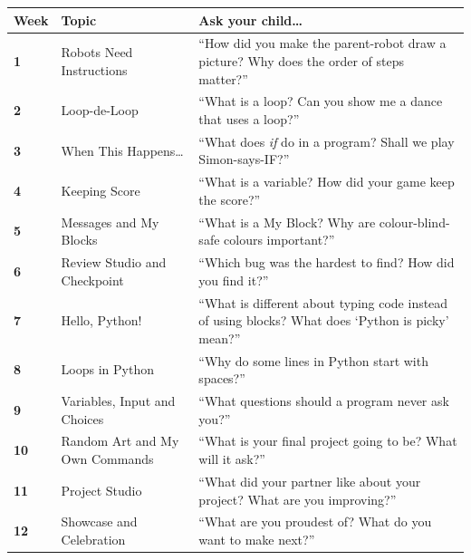 \documentclass[level=1]{kidscode}
\begin{document}
\begin{center}\small\renewcommand{\arraystretch}{1.45}
\begin{tabularx}{\linewidth}{@{}>{\bfseries}p{1.3cm}>{\RaggedRight}p{4.2cm}>{\RaggedRight\arraybackslash}X@{}}
\toprule
Week & Topic & Ask your child\dots\\
\midrule
1 & Robots Need Instructions & \enquote{How did you make the parent-robot draw a picture? Why does the order of steps matter?}\\
2 & Loop-de-Loop & \enquote{What is a loop? Can you show me a dance that uses a loop?}\\
3 & When This Happens\dots & \enquote{What does \emph{if} do in a program? Shall we play Simon-says-IF?}\\
4 & Keeping Score & \enquote{What is a variable? How did your game keep the score?}\\
5 & Messages and My Blocks & \enquote{What is a My Block? Why are colour-blind-safe colours important?}\\
6 & Review Studio and Checkpoint & \enquote{Which bug was the hardest to find? How did you find it?}\\
7 & Hello, Python! & \enquote{What is different about typing code instead of using blocks? What does \enquote{Python is picky} mean?}\\
8 & Loops in Python & \enquote{Why do some lines in Python start with spaces?}\\
9 & Variables, Input and Choices & \enquote{What questions should a program never ask you?}\\
10 & Random Art and My Own Commands & \enquote{What is your final project going to be? What will it ask?}\\
11 & Project Studio & \enquote{What did your partner like about your project? What are you improving?}\\
12 & Showcase and Celebration & \enquote{What are you proudest of? What do you want to make next?}\\
\bottomrule
\end{tabularx}
\end{center}
\end{document}
